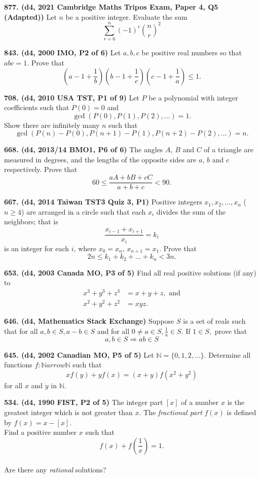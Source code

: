 \documentclass{article}
\begin{document}
\textbf{877. (\color{red}d4\color{black}, 2021 Cambridge Maths Tripos Exam, Paper 4, Q5 (Adapted))} Let $n$ be a positive integer. Evaluate the sum
$$
    \sum_{r=0}^{n}(-1)^{r}\binom{n}{r}^2
$$

\textbf{843. (\color{red}d4\color{black}, 2000 IMO, P2 of 6)} Let $ a, b, c$ be positive real numbers so that $ abc = 1$. Prove that
\[ ( a - 1 + \frac 1b ) ( b - 1 + \frac 1c ) ( c - 1 + \frac 1a ) \leq 1.
\]

\textbf{708. (\color{red}d4\color{black}, 2010 USA TST, P1 of 9)} Let $P$ be a polynomial with integer coefficients such that $P(0)=0$ and
\[\gcd(P(0), P(1), P(2), \ldots ) = 1.\]
Show there are infinitely many $n$ such that
\[\gcd(P(n)- P(0), P(n+1)-P(1), P(n+2)-P(2), \ldots) = n.\]

\textbf{668. (\color{red}d4\color{black}, 2013/14 BMO1, P6 of 6)} The angles $A$, $B$ and $C$ of a triangle are measured in degrees, and the lengths of the opposite sides are $a$, $b$ and $c$ respectively. Prove that $$60\le \frac{aA+bB+cC}{a+b+c} < 90.$$

\textbf{667. (\color{red}d4\color{black}, 2014 Taiwan TST3 Quiz 3, P1)} Positive integers $x_1, x_2, \dots, x_n$ ($n \ge 4$) are arranged in a circle such that each $x_i$ divides the sum of the neighbors; that is\[ \frac{x_{i-1}+x_{i+1}}{x_i} = k_i \]is an integer for each $i$, where $x_0 = x_n$, $x_{n+1} = x_1$. Prove that\[ 2n \le k_1 + k_2 + \dots + k_n < 3n. \]

\textbf{653. (\color{red}d4\color{black}, 2003 Canada MO, P3 of 5)} Find all real positive solutions (if any) to
\begin{align*}
    x^3 + y^3 + z^3 & = x + y + z, \text{ and} \\
    x^2 + y^2 + z^2 & = xyz.
\end{align*}

\textbf{646. (\color{red}d4\color{black}, Mathematics Stack Exchange)} Suppose $S$ is a set of reals such that for all $a, b \in S, a-b \in S$ and for all $0 \neq a \in S, \frac{1}{a} \in S .$ If $1 \in S,$ prove that
$$ a, b \in S \Longrightarrow a b \in S $$

\textbf{645. (\color{red}d4\color{black}, 2002 Canadian MO, P5 of 5)} Let $\mathbb{N}=\{0,1,2, \ldots\}$. Determine all functions $f: \mathbb{N} arrow \mathbb{N}$ such that
$$
    x f(y)+y f(x)=(x+y) f(x^{2}+y^{2})
$$
for all $x$ and $y$ in $\mathbb{N}$.

\textbf{534. (\color{red}d4\color{black}, 1990 FIST, P2 of 5)} The integer part $[ x ]$ of a number $x$ is the greatest integer which is not greater than $x$. The \textit{fractional part} $f(x)$ is defined by $f(x) = x - [x ]$. \\
Find a positive number $x$ such that $$f(x) + f( \frac1x) = 1.$$\\
Are there any \textit{rational} solutions?
\end{document}
